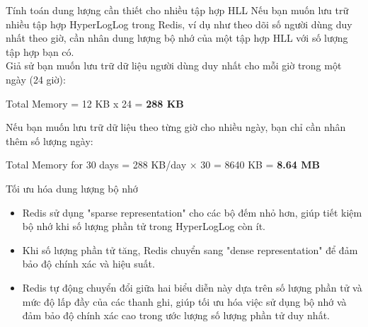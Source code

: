 \documentclass[10pt]{beamer}
\begin{document}
\begin{frame}[fragile]{Tính toán dung lượng cần thiết cho nhiều tập hợp HLL}
Nếu bạn muốn lưu trữ nhiều tập hợp HyperLogLog trong Redis, ví dụ như 
theo dõi số người dùng duy nhất theo giờ, cần nhân dung lượng bộ nhớ 
của một tập hợp HLL với số lượng tập hợp bạn có.\\
Giả sử bạn muốn lưu trữ dữ liệu người dùng duy nhất cho mỗi giờ trong 
một ngày (24 giờ):\\
\begin{center}
  Total Memory = 12 KB x 24 = \textbf{288 KB}
\end{center} 
Nếu bạn muốn lưu trữ dữ liệu theo từng giờ cho nhiều ngày, bạn chỉ cần 
nhân thêm số lượng ngày:
\begin{center}
  Total Memory for 30 days = 288 KB/day × 30 = 8640 KB = \textbf{8.64 MB}
\end{center} 
\end{frame}

\begin{frame}[fragile]{Tối ưu hóa dung lượng bộ nhớ}
  \begin{itemize}
    \item Redis sử dụng "sparse representation" cho các bộ đếm nhỏ hơn, 
    giúp tiết kiệm bộ nhớ khi số lượng phần tử trong HyperLogLog còn ít.
    \item Khi số lượng phần tử tăng, Redis chuyển sang "dense representation" 
    để đảm bảo độ chính xác và hiệu suất.
    \item Redis tự động chuyển đổi giữa hai biểu diễn này dựa trên số lượng 
    phần tử và mức độ lấp đầy của các thanh ghi, giúp tối ưu hóa việc 
    sử dụng bộ nhớ và đảm bảo độ chính xác cao trong ước lượng số lượng 
    phần tử duy nhất.
  \end{itemize}
\end{frame}
\end{document}

